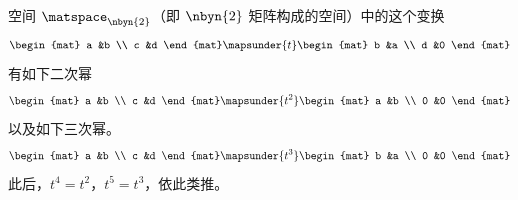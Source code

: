 \begin{example}
空间 $\matspace_{\nbyn{2}}$（即 $\nbyn{2}$ 矩阵构成的空间）中的这个变换
\begin{equation*}
  \begin{mat}
    a  &b  \\
    c  &d
  \end{mat}
  \mapsunder{t}
  \begin{mat}
    b  &a  \\
    d  &0
  \end{mat}
\end{equation*}
有如下二次幂
\begin{equation*}
  \begin{mat}
    a  &b  \\
    c  &d
  \end{mat}
  \mapsunder{t^2}
  \begin{mat}
    a  &b  \\
    0  &0
  \end{mat}
\end{equation*}
以及如下三次幂。
\begin{equation*}
  \begin{mat}
    a  &b  \\
    c  &d
  \end{mat}
  \mapsunder{t^3}
  \begin{mat}
    b  &a  \\
    0  &0
  \end{mat}
\end{equation*}
此后，$t^4=t^2$，$t^5=t^3$，依此类推。
\end{example}

